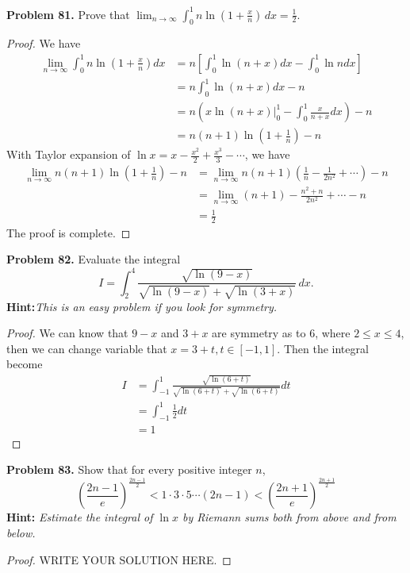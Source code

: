 \documentclass[12pt,leqno]{amsart}
\begin{document}
\noindent
{\bf Problem 81.}
Prove that $\displaystyle\lim_{n\to\infty}\int_0^1n\ln\left(1+\frac{x}{n}\right)\, dx=\frac{1}{2}$.
\begin{proof}
We have 
\begin{align*}
    \lim_{n\to\infty}\int_0^1n\ln\left(1+\frac{x}{n}\right)dx & = n \left[\int^1_0\ln (n+x)dx - \int^1_0\ln ndx\right] \\
    & = n \int^1_0\ln (n+x)dx - n \\
    & = n \left(\left. x\ln (n+x)\right|^1_0 - \int^1_0 \frac{x}{n+x}dx\right) - n \\
    & = n(n+1)\ln \left(1+\frac{1}{n}\right) - n
\end{align*}
With Taylor expansion of $\ln x = x - \frac{x^2}{2} + \frac{x^3}{3} - \cdots$, we have 
\begin{align*}
    \lim_{n\to\infty}n(n+1)\ln \left(1+\frac{1}{n}\right) - n & = \lim_{n\to\infty} n(n+1)\left(\frac{1}{n} - \frac{1}{2n^2} + \cdots\right) - n \\
    & = \lim_{n\to\infty} (n+1) - \frac{n^2+n}{2n^2} + \cdots - n \\
    & = \frac{1}{2}
\end{align*}
The proof is complete.
\end{proof}

\noindent
{\bf Problem 82.}
Evaluate the integral
$$
I=\int_2^4\frac{\sqrt{\ln(9-x)}}{\sqrt{\ln(9-x)}+\sqrt{\ln(3+x)}}\, dx.
$$
{\bf Hint:}{\em This is an easy problem if you look for symmetry.}
\begin{proof}
We can know that $9-x$ and $3+x$ are symmetry as to $6$, where $2\leq x \leq 4$, then we can change variable that $x = 3 + t, t\in[-1,1]$. Then the integral become 
\begin{align*}
    I & = \int_{-1}^1\frac{\sqrt{\ln(6+t)}}{\sqrt{\ln(6+t)}+\sqrt{\ln(6+t)}} dt \\
    & = \int_{-1}^1 \frac{1}{2}dt \\
    & = 1
\end{align*}
\end{proof}

\medskip

\noindent
{\bf Problem 83.}
Show that for every positive integer $n$,
$$
\left(\frac{2n-1}{e}\right)^{\frac{2n-1}{2}}<1 \cdot 3\cdot 5\cdots(2n-1)<
\left(\frac{2n+1}{e}\right)^{\frac{2n+1}{2}}
$$
{\bf Hint:} {\em Estimate the integral of $\ln x$ by Riemann sums both from above and from below.}
\begin{proof}
WRITE YOUR SOLUTION HERE.
\end{proof}
\end{document}

